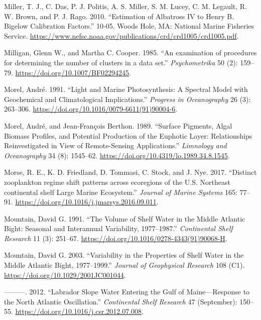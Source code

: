 \documentclass[
]{book}
\newlength{\cslhangindent}
\newenvironment{cslreferences}%
  {\setlength{\parindent}{0pt}%
  \everypar{\setlength{\hangindent}{\cslhangindent}}\ignorespaces}%
  {\par}
\begin{document}
\begin{cslreferences}
\leavevmode\hypertarget{ref-Miller_2010}{}%
Miller, T. J., C. Das, P. J. Politis, A. S. Miller, S. M. Lucey, C. M. Legault, R. W. Brown, and P. J. Rago. 2010. ``Estimation of Albatross IV to Henry B. Bigelow Calibration Factors.'' 10-05. Woods Hole, MA: National Marine Fisheries Service. \url{https://www.nefsc.noaa.gov/publications/crd/crd1005/crd1005.pdf}.

\leavevmode\hypertarget{ref-Milligan1985}{}%
Milligan, Glenn W., and Martha C. Cooper. 1985. ``An examination of procedures for determining the number of clusters in a data set.'' \emph{Psychometrika} 50 (2): 159--79. \url{https://doi.org/10.1007/BF02294245}.

\leavevmode\hypertarget{ref-SOE7}{}%
Morel, André. 1991. ``Light and Marine Photosynthesis: A Spectral Model with Geochemical and Climatological Implications.'' \emph{Progress in Oceanography} 26 (3): 263--306. \url{https://doi.org/10.1016/0079-6611(91)90004-6}.

\leavevmode\hypertarget{ref-SOE8}{}%
Morel, André, and Jean-François Berthon. 1989. ``Surface Pigments, Algal Biomass Profiles, and Potential Production of the Euphotic Layer: Relationships Reinvestigated in View of Remote-Sensing Applications.'' \emph{Limnology and Oceanography} 34 (8): 1545--62. \url{https://doi.org/10.4319/lo.1989.34.8.1545}.

\leavevmode\hypertarget{ref-Morse2017}{}%
Morse, R. E., K. D. Friedland, D. Tommasi, C. Stock, and J. Nye. 2017. ``Distinct zooplankton regime shift patterns across ecoregions of the U.S. Northeast continental shelf Large Marine Ecosystem.'' \emph{Journal of Marine Systems} 165: 77--91. \url{https://doi.org/10.1016/j.jmarsys.2016.09.011}.

\leavevmode\hypertarget{ref-mountain1991}{}%
Mountain, David G. 1991. ``The Volume of Shelf Water in the Middle Atlantic Bight: Seasonal and Interannual Variability, 1977--1987.'' \emph{Continental Shelf Research} 11 (3): 251--67. \url{https://doi.org/10.1016/0278-4343(91)90068-H}.

\leavevmode\hypertarget{ref-mountain_variability_2003}{}%
Mountain, David G. 2003. ``Variability in the Properties of Shelf Water in the Middle Atlantic Bight, 1977--1999.'' \emph{Journal of Geophysical Research} 108 (C1). \url{https://doi.org/10.1029/2001JC001044}.

\leavevmode\hypertarget{ref-mountain_labrador_2012}{}%
---------. 2012. ``Labrador Slope Water Entering the Gulf of Maine---Response to the North Atlantic Oscillation.'' \emph{Continental Shelf Research} 47 (September): 150--55. \url{https://doi.org/10.1016/j.csr.2012.07.008}.


\end{cslreferences}
\end{document}
